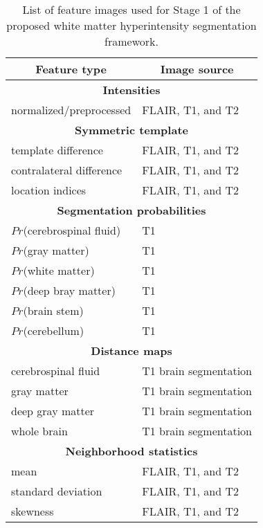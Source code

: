 \begin{table}[!htb]
  \centering
  \begin{tabular*}{0.65\textwidth}{@{\extracolsep{\fill}} ll}
    \multicolumn{1}{c}{\textbf{Feature type}} & \multicolumn{1}{c}{\textbf{Image source}} \\
    \toprule
    \midrule
    \multicolumn{2}{c}{\textbf{Intensities}} \\
    \midrule
    normalized/preprocessed & FLAIR, T1, and T2 \\
    \midrule
    \multicolumn{2}{c}{\textbf{Symmetric template}} \\
    \midrule
    template difference & FLAIR, T1, and T2 \\
    contralateral difference & FLAIR, T1, and T2 \\
    location indices & FLAIR, T1, and T2 \\
    \midrule
    \multicolumn{2}{c}{\textbf{Segmentation probabilities}} \\
    \midrule
    $Pr$(cerebrospinal fluid) & T1 \\
    $Pr$(gray matter) & T1 \\
    $Pr$(white matter) & T1 \\
    $Pr$(deep bray matter) & T1 \\
    $Pr$(brain stem) & T1 \\
    $Pr$(cerebellum) & T1 \\
    \midrule
    \multicolumn{2}{c}{\textbf{Distance maps}} \\
    \midrule
    cerebrospinal fluid & T1 brain segmentation \\
    gray matter & T1 brain segmentation \\
    deep gray matter & T1 brain segmentation \\
    whole brain & T1 brain segmentation \\
    \midrule
    \multicolumn{2}{c}{\textbf{Neighborhood statistics}} \\
    \midrule
    mean & FLAIR, T1, and T2 \\
    standard deviation & FLAIR, T1, and T2 \\
    skewness & FLAIR, T1, and T2 \\
    \midrule
    \bottomrule
  \end{tabular*}
 \label{table:indices}
 \caption{List of feature images used for Stage 1 of the proposed white matter
          hyperintensity segmentation framework.}
\end{table}



